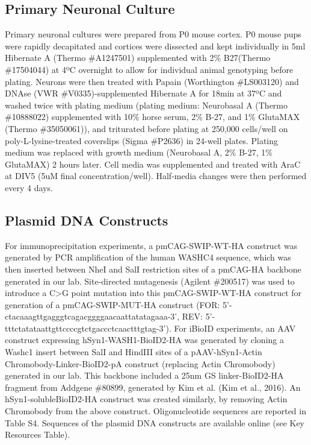 \subsection{Primary Neuronal Culture}

Primary neuronal cultures were prepared from P0 mouse cortex. P0 mouse pups were
rapidly decapitated and cortices were dissected and kept individually in 5ml
Hibernate A (Thermo \#A1247501) supplemented with 2\% B27(Thermo \#17504044) at
4ºC overnight to allow for individual animal genotyping before plating. Neurons
were then treated with Papain (Worthington \#LS003120) and DNAse (VWR
\#V0335)-supplemented Hibernate A for 18min at 37ºC and washed twice with
plating medium (plating medium: Neurobasal A (Thermo \#10888022) supplemented
with 10\% horse serum, 2\% B-27, and 1\% GlutaMAX (Thermo \#35050061)), and
triturated before plating at 250,000 cells/well on poly-L-lysine-treated
coverslips (Sigma \#P2636) in 24-well plates. Plating medium was replaced with
growth medium (Neurobasal A, 2\% B-27, 1\% GlutaMAX) 2 hours later. Cell media
was supplemented and treated with AraC at DIV5 (5uM final concentration/well).
Half-media changes were then performed every 4 days. 

\subsection{Plasmid DNA Constructs}

For immunoprecipitation experiments, a pmCAG-SWIP-WT-HA construct was generated
by PCR amplification of the human WASHC4 sequence, which was then inserted
between NheI and SalI restriction sites of a pmCAG-HA backbone generated in our
lab. Site-directed mutagenesis (Agilent \#200517) was used to introduce a C>G
point mutation into this pmCAG-SWIP-WT-HA construct for generation of a
pmCAG-SWIP-MUT-HA construct (FOR:
5'-ctacaaagttgagggtcagacggggaacaattatatagaaa-3', REV:
5'-tttctatataattgttccccgtctgaccctcaactttgtag-3’). For iBioID experiments, an AAV
construct expressing hSyn1-WASH1-BioID2-HA was generated by cloning a Washc1
insert between SalI and HindIII sites of a pAAV-hSyn1-Actin
Chromobody-Linker-BioID2-pA construct (replacing Actin Chromobody) generated in
our lab. This backbone included a 25nm GS linker-BioID2-HA fragment from Addgene
\#80899, generated by Kim et al. (Kim et al., 2016). An hSyn1-solubleBioID2-HA
construct was created similarly, by removing Actin Chromobody from the above
construct. Oligonucleotide sequences are reported in Table S4. Sequences of the
plasmid DNA constructs are available online (see Key Resources Table). 

